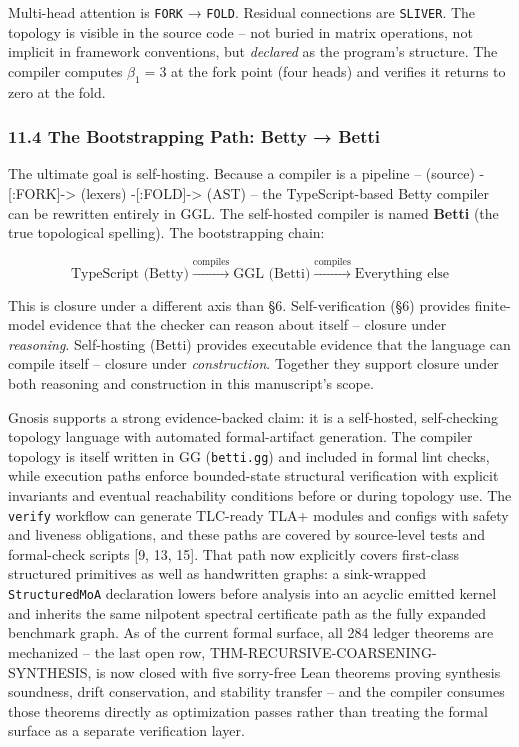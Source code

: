 \documentclass[
  11pt,
]{article}
\begin{document}
Multi-head attention is \texttt{FORK} → \texttt{FOLD}. Residual
connections are \texttt{SLIVER}. The topology is visible in the
source code -- not buried in matrix operations, not implicit in
framework conventions, but \emph{declared} as the program's structure.
The compiler computes \(\beta_1 = 3\) at the fork point (four heads) and
verifies it returns to zero at the fold.

\subsubsection{11.4 The Bootstrapping Path: Betty →
Betti}\label{the-bootstrapping-path-betty-betti}

The ultimate goal is self-hosting. Because a compiler is a pipeline --
(source) -{[}:FORK{]}-\textgreater{} (lexers)
-{[}:FOLD{]}-\textgreater{} (AST) -- the TypeScript-based Betty compiler
can be rewritten entirely in GGL. The self-hosted compiler is named
\textbf{Betti} (the true topological spelling). The bootstrapping chain:

\[
\text{TypeScript (Betty)} \xrightarrow{\text{compiles}} \text{GGL (Betti)} \xrightarrow{\text{compiles}} \text{Everything else}
\]

This is closure under a different axis than §6. Self-verification (§6)
provides finite-model evidence that the checker can reason about itself
-- closure under \emph{reasoning}. Self-hosting (Betti) provides
executable evidence that the language can compile itself -- closure
under \emph{construction}. Together they support closure under both
reasoning and construction in this manuscript's scope.

Gnosis supports a strong evidence-backed claim: it is a self-hosted,
self-checking topology language with automated formal-artifact
generation. The compiler topology is itself written in GG
(\texttt{betti.gg}) and included in formal lint checks, while execution
paths enforce bounded-state structural verification with explicit
invariants and eventual reachability conditions before or during
topology use. The \texttt{verify} workflow can generate TLC-ready TLA+
modules and configs with safety and liveness obligations, and these
paths are covered by source-level tests and formal-check scripts {[}9,
13, 15{]}. That path now explicitly covers first-class structured
primitives as well as handwritten graphs: a sink-wrapped
\texttt{StructuredMoA} declaration lowers before analysis into an
acyclic emitted kernel and inherits the same nilpotent spectral
certificate path as the fully expanded benchmark graph. As of the
current formal surface, all 284 ledger theorems are mechanized -- the
last open row, THM-RECURSIVE-COARSENING-SYNTHESIS, is now closed with
five sorry-free Lean theorems proving synthesis soundness, drift
conservation, and stability transfer -- and the compiler consumes those
theorems directly as optimization passes rather than treating the formal
surface as a separate verification layer.
\end{document}
